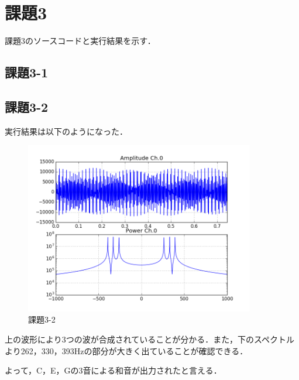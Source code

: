\section{課題3}
課題3のソースコードと実行結果を示す．


\subsection{課題3-1}


\subsection{課題3-2}


実行結果は以下のようになった．

\begin{figure}[h]
  \begin{center}
    \includegraphics[width=10cm]{./img/kadai3-2.png}
    \caption{課題3-2}
  \end{center}
\end{figure}

上の波形により3つの波が合成されていることが分かる．また，下のスペクトルより262，330，393Hzの部分が大きく出ていることが確認できる．

よって，C，E，Gの3音による和音が出力されたと言える．
